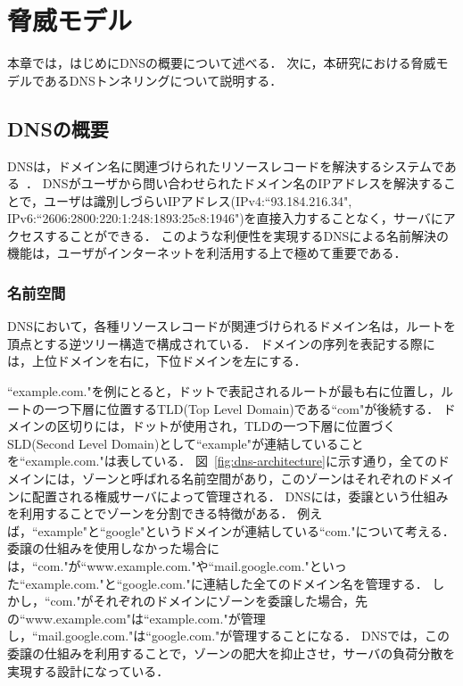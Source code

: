 \section{脅威モデル}
\label{sec:dns-tunneling}
本章では，はじめにDNSの概要について述べる．
次に，本研究における脅威モデルであるDNSトンネリングについて説明する．

\subsection{DNSの概要}
\label{sec:dns-protocol}

DNSは，ドメイン名に関連づけられたリソースレコードを解決するシステムである~\cite{rfc1034, rfc1035}．
DNSがユーザから問い合わせられたドメイン名のIPアドレスを解決することで，ユーザは識別しづらいIPアドレス(IPv4:``93.184.216.34", IPv6:``2606:2800:220:1:248:1893:25c8:1946")を直接入力することなく，サーバにアクセスすることができる．
このような利便性を実現するDNSによる名前解決の機能は，ユーザがインターネットを利活用する上で極めて重要である．

\subsubsection{名前空間}
DNSにおいて，各種リソースレコードが関連づけられるドメイン名は，ルートを頂点とする逆ツリー構造で構成されている．
ドメインの序列を表記する際には，上位ドメインを右に，下位ドメインを左にする．


``example.com."を例にとると，ドットで表記されるルートが最も右に位置し，ルートの一つ下層に位置するTLD(Top Level Domain)である``com"が後続する．
ドメインの区切りには，ドットが使用され，TLDの一つ下層に位置づくSLD(Second Level Domain)として``example"が連結していることを``example.com."は表している．
図~\ref{fig:dns-architecture}に示す通り，全てのドメインには，ゾーンと呼ばれる名前空間があり，このゾーンはそれぞれのドメインに配置される権威サーバによって管理される．
DNSには，委譲という仕組みを利用することでゾーンを分割できる特徴がある．
例えば，``example"と``google"というドメインが連結している``com."について考える．
委譲の仕組みを使用しなかった場合には，``com."が``www.example.com."や``mail.google.com."といった``example.com."と``google.com."に連結した全てのドメイン名を管理する．
しかし，``com."がそれぞれのドメインにゾーンを委譲した場合，先の``www.example.com"は``example.com."が管理し，``mail.google.com."は``google.com."が管理することになる．
DNSでは，この委譲の仕組みを利用することで，ゾーンの肥大を抑止させ，サーバの負荷分散を実現する設計になっている．

